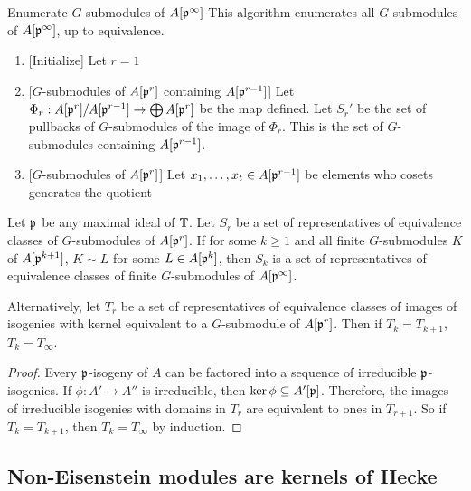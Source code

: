 \documentclass{article}
\begin{document}
\begin{algorithm}{Enumerate $G$-submodules of ${A[\mathfrak{p}^\infty]}$}
    This algorithm enumerates all $G$-submodules of $A[\mathfrak{p}^\infty]$, up to
    equivalence.
    \begin{enumerate}
        \item{} [Initialize]
            Let $r=1$
        \item{} [$G$-submodules of $A[\mathfrak{p}^r]$ containing $A[\mathfrak{p}^{r-1}]$]
            Let $\Phi_r:A[\mathfrak{p}^r]/A[\mathfrak{p}^{r-1}]\to \bigoplus A[\mathfrak{p}^r]$ be the map
            defined. Let $S_r '$ be the set of pullbacks of $G$-submodules of the
            image of $\Phi_r$. This is the set of $G$-submodules containing
            $A[\mathfrak{p}^{r-1}]$.
        \item{} [$G$-submodules of $A[\mathfrak{p}^r]$]
            Let $x_1,\ldots, x_t\in A[\mathfrak{p}^{r-1}]$ be elements who cosets
            generates the quotient 
    \end{enumerate}
\end{algorithm}

\begin{proposition}\label{prop:powers_of_primes}
    Let $\mathfrak{p}$ be any maximal ideal of $\mathbb{T}$. Let $S_r$ be a set of
    representatives of equivalence classes of $G$-submodules of $A[\mathfrak{p}^r]$. If
    for some $k\geq 1$ and all finite $G$-submodules $K$ of $A[\mathfrak{p}^{k+1}]$,
    $K\sim L$ for some $L\in A[\mathfrak{p}^k]$, then $S_k$ is a set of representatives
    of equivalence classes of finite $G$-submodules of $A[\mathfrak{p}^\infty]$.

    Alternatively, let $T_r$ be a set of representatives of equivalence classes
    of images of isogenies with kernel equivalent to a $G$-submodule of
    $A[\mathfrak{p}^r]$. Then if $T_{k}=T_{k+1}$, $T_k=T_\infty$.
\end{proposition}
\begin{proof}
    Every $\mathfrak{p}$-isogeny of $A$ can be factored into a sequence of irreducible
    $\mathfrak{p}$-isogenies. If $\phi:A'\to A''$ is irreducible, then $\ker\phi\subseteq
    A'[\mathfrak{p}]$. Therefore, the images of irreducible isogenies with domains in
    $T_r$ are equivalent to ones in $T_{r+1}$. So if $T_k=T_{k+1}$, then
    $T_k=T_\infty$ by induction.
\end{proof}

\subsection{Non-Eisenstein modules are kernels of Hecke}%
\label{sub:non_eisenstein_modules_are_kernels_of_hecke}
\end{document}
